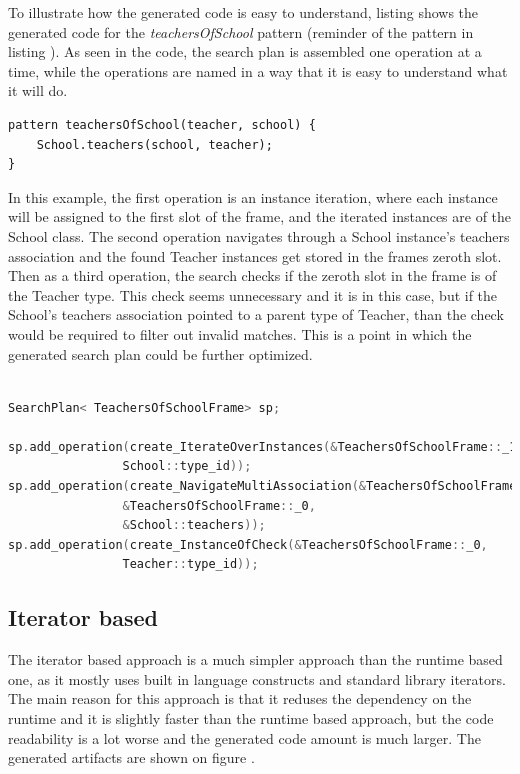 To illustrate how the generated code is easy to understand, listing
 shows the generated code for the
\emph{teachersOfSchool} pattern (reminder of the pattern in listing
). As seen in the code, the search plan is assembled
one operation at a time, while the operations are named in a way that it is easy
to understand what it will do. 

\begin{lstlisting}[frame=single,float=!ht,language=IQPL,
label=listing:tos_pattern_rem, caption=Teachers of school pattern as a
reminder] 
pattern teachersOfSchool(teacher, school) {
	School.teachers(school, teacher); 
}
\end{lstlisting}

In this example, the first operation is an instance iteration, where each
instance will be assigned to the first slot of the frame, and the iterated
instances are of the School class. The second operation navigates through a
School instance's teachers association and the found Teacher instances get
stored in the frames zeroth slot. Then as a third operation, the search checks if the
zeroth slot in the frame is of the Teacher type. This check seems unnecessary
and it is in this case, but if the School's teachers association pointed to a
parent type of Teacher, than the check would be required to filter out invalid
matches. This is a point in which the generated search plan could be further
optimized.

\begin{lstlisting}[frame=single,float=!ht,language=C++,
label=listing:tos_gen_runtime, caption=Segment of the generated code for
teachers of school]

SearchPlan< TeachersOfSchoolFrame> sp;
		
sp.add_operation(create_IterateOverInstances(&TeachersOfSchoolFrame::_1,
				School::type_id));
sp.add_operation(create_NavigateMultiAssociation(&TeachersOfSchoolFrame::_1,
				&TeachersOfSchoolFrame::_0,
				&School::teachers));
sp.add_operation(create_InstanceOfCheck(&TeachersOfSchoolFrame::_0,
				Teacher::type_id));

\end{lstlisting}


\subsection{Iterator based}

The iterator based approach is a much simpler approach than the runtime based
one, as it mostly uses built in language constructs and standard library
iterators. The main reason for this approach is that it reduses the dependency
on the runtime and it is slightly faster than the runtime based approach, but
the code readability is a lot worse and the generated code amount is much
larger. The generated artifacts are shown on figure .

